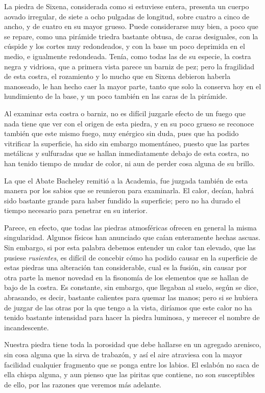\documentclass[a4paper, 11pt, oneside, polutonikogreek, spanish]{article}
\begin{document}
La piedra de Sixena, considerada como si estuviese entera, presenta un cuerpo aovado irregular, de siete a ocho pulgadas de longitud, sobre cuatro a cinco de ancho, y de cuatro en su mayor grueso. Puede considerarse muy bien, a poco que se repare, como una pirámide triedra bastante obtusa, de caras desiguales, con la cúspide y los cortes muy redondeados, y con la base un poco deprimida en el medio, e igualmente redondeada. Tenía, como todas las de su especie, la costra negra y vidriosa, que a primera vista parece un barniz de pez; pero la fragilidad de esta costra, el rozamiento y lo mucho que en Sixena debieron haberla manoseado, le han hecho caer la mayor parte, tanto que solo la conserva hoy en el hundimiento de la base, y un poco también en las caras de la pirámide.

Al examinar esta costra o barniz, no es difícil juzgarle efecto de un fuego que nada tiene que ver con el origen de esta piedra, y en su poco grueso se reconoce también que este mismo fuego, muy enérgico sin duda, pues que ha podido vitrificar la superficie, ha sido sin embargo momentáneo, puesto que las partes metálicas y sulfuradas que se hallan inmediatamente debajo de esta costra, no han tenido tiempo de mudar de color, ni aun de perder cosa alguna de su brillo.

La que el Abate Bacheley remitió a la Academia, fue juzgada también de esta manera por los sabios que se reunieron para examinarla. El calor, decían, habrá sido bastante grande para haber fundido la superficie; pero no ha durado el tiempo necesario para penetrar en su interior.

Parece, en efecto, que todas las piedras atmosféricas ofrecen en general la misma singularidad. Algunos físicos han anunciado que caían enteramente hechas ascuas. Sin embargo, si por esta palabra debemos entender un calor tan elevado, que las pusiese \emph{rusientes}, es difícil de concebir cómo ha podido causar en la superficie de estas piedras una alteración tan considerable, cual es la fusión, sin causar por otra parte la menor novedad en la fisonomía de los elementos que se hallan de bajo de la costra. Es constante, sin embargo, que llegaban al suelo, según se dice, abrasando, es decir, bastante calientes para quemar las manos; pero si se hubiera de juzgar de las otras por la que tengo a la vista, diríamos que este calor no ha tenido bastante intensidad para hacer la piedra luminosa, y merecer el nombre de incandescente.

Nuestra piedra tiene toda la porosidad que debe hallarse en un agregado arenisco, sin cosa alguna que la sirva de trabazón, y así el aire atraviesa con la mayor facilidad cualquier fragmento que se ponga entre los labios. El eslabón no saca de ella chispa alguna, y aun pienso que las piritas que contiene, no son susceptibles de ello, por las razones que veremos más adelante.
\end{document}
